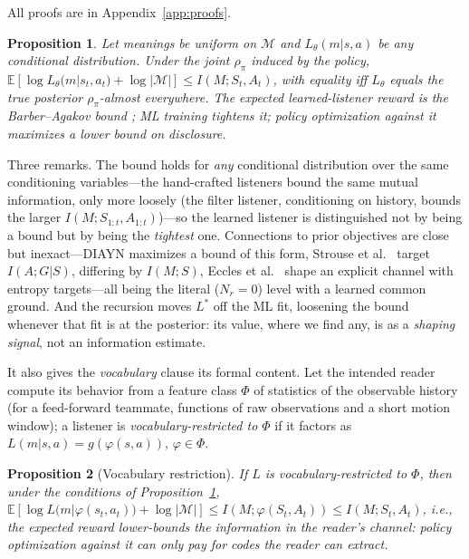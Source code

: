 \documentclass[sigconf,review,anonymous]{acmart}
\newtheorem{proposition}{Proposition}
\newcommand{\Ltheta}{L_\theta}
\begin{document}
All proofs are in Appendix~\ref{app:proofs}.

\begin{proposition}
\label{prop:mi}
Let meanings be uniform on $\mathcal{M}$ and $\Ltheta(m|s,a)$ be any conditional distribution. Under the joint $\rho_\pi$ induced by the policy,
$\mathbb{E}[\log \Ltheta(m|s_t,a_t) + \log|\mathcal{M}|] \leq I(M; S_t, A_t)$,
with equality iff $\Ltheta$ equals the true posterior $\rho_\pi$-almost everywhere. The expected learned-listener reward is the Barber--Agakov bound \cite{barber2003im}; ML training tightens it; policy optimization against it maximizes a lower bound on disclosure.
\end{proposition}

Three remarks. The bound holds for \emph{any} conditional distribution over the same conditioning variables---the hand-crafted listeners bound the same mutual information, only more loosely (the filter listener, conditioning on history, bounds the larger $I(M;S_{1:t},A_{1:t})$)---so the learned listener is distinguished not by being a bound but by being the \emph{tightest} one. Connections to prior objectives are close but inexact---DIAYN \cite{eysenbach2019diversity} maximizes a bound of this form, Strouse et al.~\cite{strouse2018learning} target $I(A;G|S)$, differing by $I(M;S)$, Eccles et al.~\cite{eccles2019biases} shape an explicit channel with entropy targets---all being the literal ($N_r=0$) level with a learned common ground. And the recursion moves $L^*$ off the ML fit, loosening the bound whenever that fit is at the posterior: its value, where we find any, is as a \emph{shaping signal}, not an information estimate.

It also gives the \emph{vocabulary} clause its formal content. Let the intended reader compute its behavior from a feature class $\Phi$ of statistics of the observable history (for a feed-forward teammate, functions of raw observations and a short motion window); a listener is \emph{vocabulary-restricted to $\Phi$} if it factors as $L(m|s,a) = g(\varphi(s,a))$, $\varphi \in \Phi$.

\begin{proposition}[Vocabulary restriction]
\label{prop:vocab}
If $L$ is vocabulary-restricted to $\Phi$, then under the conditions of Proposition~\ref{prop:mi},
$\mathbb{E}[\log L(m|\varphi(s_t,a_t)) + \log|\mathcal{M}|] \leq I(M; \varphi(S_t, A_t)) \leq I(M; S_t, A_t)$,
i.e., the expected reward lower-bounds the information in the \emph{reader's channel}: policy optimization against it can only pay for codes the reader can extract.
\end{proposition}
\end{document}
